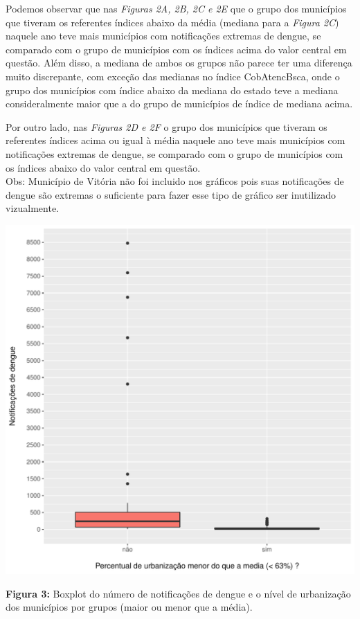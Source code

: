\documentclass[12pt,a4paper]{article}\usepackage[]{graphicx}\usepackage[]{color}
\makeatletter
\def\maxwidth{ %
  \ifdim\Gin@nat@width>\linewidth
    \linewidth
  \else
    \Gin@nat@width
  \fi
}
\newenvironment{knitrout}{}{} %
\makeatother
\begin{document}
\newpage
Podemos observar que nas \emph{Figuras 2A, 2B, 2C e 2E} que o grupo dos municípios que tiveram os referentes índices abaixo da média (mediana para a \emph{Figura 2C}) naquele ano teve mais municípios com notificações extremas de dengue, se comparado com o grupo de municípios com os índices acima do valor central em questão. Além disso, a mediana de ambos os grupos não parece ter uma diferença muito discrepante, com exceção das medianas no índice CobAtencBsca, onde o grupo dos municípios com índice abaixo da mediana do estado teve a mediana consideralmente maior que a do grupo de municípios de índice de mediana acima.

Por outro lado, nas \emph{Figuras 2D e 2F} o grupo dos municípios que tiveram os referentes índices acima ou igual à média naquele ano teve mais municípios com notificações extremas de dengue, se comparado com o grupo de municípios com os índices abaixo do valor central em questão.\\

\noindent
Obs: Município de Vitória não foi incluido nos gráficos pois suas notificações de dengue são extremas o suficiente para fazer esse tipo de gráfico ser inutilizado vizualmente.

\newpage
\begin{knitrout}
\color{fgcolor}
\includegraphics[width=\maxwidth]{figure/unnamed-chunk-5-1} 

\end{knitrout}
\textbf{Figura 3:} Boxplot do número de notificações de dengue e o nível de urbanização dos municípios por grupos (maior ou menor que a média).\\
\end{document}
